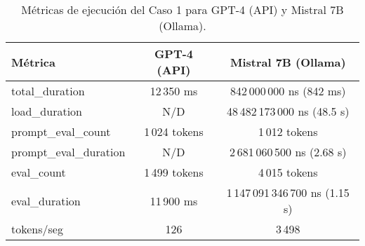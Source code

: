 
\begin{table}[h!]
\centering
\begin{tabular}{|l|c|c|}
\hline
\textbf{Métrica} & \textbf{GPT-4 (API)} & \textbf{Mistral 7B (Ollama)} \\
\hline
total\_duration & 12\,350 ms & 842\,000\,000 ns (842 ms) \\
load\_duration & N/D & 48\,482\,173\,000 ns (48.5 s) \\
prompt\_eval\_count & 1\,024 tokens & 1\,012 tokens \\
prompt\_eval\_duration & N/D & 2\,681\,060\,500 ns (2.68 s) \\
eval\_count & 1\,499 tokens & 4\,015 tokens \\
eval\_duration & 11\,900 ms & 1\,147\,091\,346\,700 ns (1.15 s) \\
tokens/seg & 126 & 3\,498 \\
\hline
\end{tabular}
\caption{Métricas de ejecución del Caso 1 para GPT-4 (API) y Mistral 7B (Ollama).}
\end{table}
